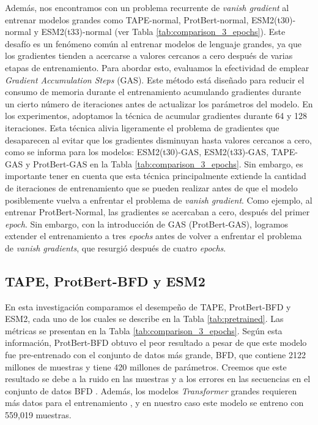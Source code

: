 Además, nos encontramos con un problema recurrente de \textit{vanish gradient} al entrenar modelos grandes como TAPE-normal, ProtBert-normal, ESM2(t30)-normal y ESM2(t33)-normal (ver Tabla \ref{tab:comparison_3_epochs}). Este desafío es un fenómeno común al entrenar modelos de lenguaje grandes, ya que los gradientes tienden a acercarse a valores cercanos a cero después de varias etapas de entrenamiento. Para abordar esto, evaluamos la efectividad de emplear \textit{Gradient Accumulation Steps} (GAS). Este método está diseñado para reducir el consumo de memoria durante el entrenamiento acumulando gradientes durante un cierto número de  iteraciones antes de actualizar los parámetros del modelo. En los experimentos, adoptamos la técnica de acumular gradientes durante 64 y 128 iteraciones. Esta técnica alivia ligeramente el problema de gradientes que desaparecen al evitar que los gradientes disminuyan hasta valores cercanos a cero, como se informa para los modelos: ESM2(t30)-GAS, ESM2(t33)-GAS, TAPE-GAS y ProtBert-GAS en la Tabla \ref{tab:comparison_3_epochs}. Sin embargo, es importante tener en cuenta que esta técnica principalmente extiende la cantidad de iteraciones de entrenamiento que se pueden realizar antes de que el modelo posiblemente vuelva a enfrentar el problema de \textit{vanish gradient}. Como ejemplo, al entrenar ProtBert-Normal, las gradientes se acercaban a cero, después del primer \textit{epoch}. Sin embargo, con la introducción de GAS (ProtBert-GAS), logramos extender el entrenamiento a tres \textit{epochs} antes de volver a enfrentar el problema de \textit{vanish gradients}, que resurgió después de cuatro \textit{epochs}.


\subsection{TAPE, ProtBert-BFD y ESM2}

En esta investigación comparamos el desempeño de TAPE, ProtBert-BFD y ESM2, cada uno de los cuales se describe en la Tabla \ref{tab:pretrained}. Las métricas se presentan en la Tabla \ref{tab:comparison_3_epochs}. Según esta información, ProtBert-BFD obtuvo el peor resultado a pesar de que este modelo fue pre-entrenado con el conjunto de datos más grande, BFD, que contiene 2122 millones de muestras y tiene 420 millones de parámetros. Creemos que este resultado se debe a la ruido en las muestras y a los errores en las secuencias en el conjunto de datos BFD \citep{elnaggar2021prottrans}. Además, los modelos \textit{Transformer} grandes requieren más datos para el entrenamiento \citep{elnaggar2021prottrans}, y en nuestro caso este modelo se entreno con 559,019 muestras.



